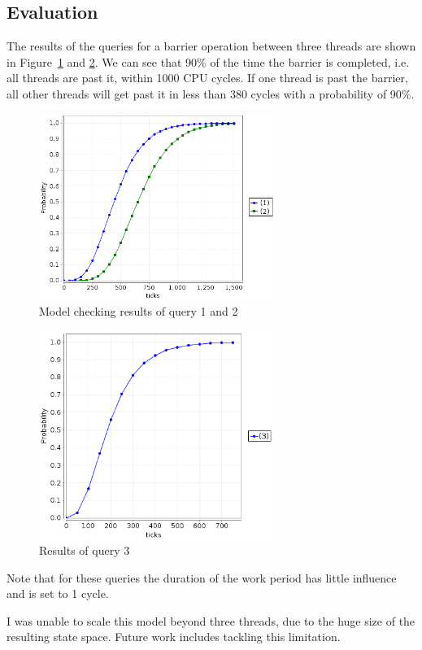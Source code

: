\documentclass[a4paper, 10pt]{article}
\begin{document}
\subsection{Evaluation}
The results of the queries for a barrier operation between three threads are shown in Figure~\ref{fig:one-and-all} and \ref{fig:one2all}. We can see that 90\% of the time the barrier is completed, i.e. all threads are past it, within 1000 CPU cycles. If one thread is past the barrier, all other threads will get past it in less than 380 cycles with a probability of 90\%.
\begin{figure}[htbp]
	\centering
	\includegraphics[width=3in]{one-and-all}
	\caption{Model checking results of query 1 and 2}
	\label{fig:one-and-all}
\end{figure}
\begin{figure}[htbp]
	\centering
	\includegraphics[width=3in]{one2all}
	\caption{Results of query 3}
	\label{fig:one2all}
\end{figure}

Note that for these queries the duration of the work period has little influence and is set to 1 cycle.

I was unable to scale this model beyond three threads, due to the huge size of the resulting state space. Future work includes tackling this limitation.
\end{document}
